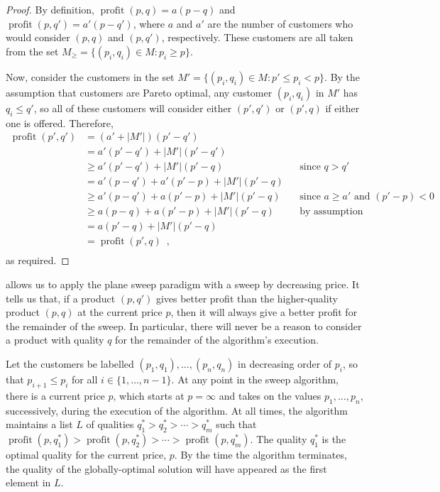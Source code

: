 \documentclass[lotsofwhite]{patmorin}
\newcommand{\val}{\operatorname{profit}}
\begin{document}
\begin{proof}
  By definition, $\val(p,q) = a(p-q)$ and $\val(p,q') = a'(p-q')$, where
  $a$ and $a'$ are the number of customers who would consider $(p,q)$
  and $(p,q')$, respectively.  These customers are all taken from the
  set $M_\ge =\{(p_i,q_i)\in M: p_i \ge p\}$.

  Now, consider the customers in the set $M'=\{(p_i,q_i)\in M: p' \le
  p_i < p\}$.  By the assumption that customers are Pareto optimal,
  any customer $(p_i,q_i)$ in $M'$ has $q_i \le q'$, so all of these
  customers will consider either $(p',q')$ or $(p',q)$ if either one
  is offered.  Therefore,
  \[
    \begin{aligned}
      \val(p',q')
        &  =   (a'+|M'|)(p'-q') \\
        &  =   a'(p'-q') + |M'|(p'-q') \\
        & \ge  a'(p'-q') + |M'|(p'-q) 
               && \mbox{since $q > q'$} \\
        &  =   a'(p-q') + a'(p'-p) + |M'|(p'-q) \\
        & \ge  a'(p-q') + a(p'-p) + |M'|(p'-q) 
               && \mbox{since $a \ge a'$ and $(p'-p) < 0$} \\
        & \ge  a(p-q) + a(p'-p) + |M'|(p'-q) 
               && \mbox{by assumption} \\
        &  =  a(p'-q) + |M'|(p'-q) \\
        &  =  \val(p',q) \enspace , \\
    \end{aligned}
  \]
  as required.
\end{proof}

 allows us to apply the plane sweep paradigm with a sweep
by decreasing price.  It tells us that, if a product $(p,q')$ gives better
profit than the higher-quality product $(p,q)$ at the current price $p$,
then it will always give a better profit for the remainder of the sweep.
In particular, there will never be a reason to consider a product with
quality $q$ for the remainder of the algorithm's execution.

Let the customers be labelled $(p_1,q_1),\ldots,(p_n,q_n)$ in decreasing
order of $p_i$, so that $p_{i+1} \le p_i$ for all $i\in\{1,\ldots,n-1\}$.
At any point in the sweep algorithm, there is a current price $p$, which
starts at $p=\infty$ and takes on the values $p_1,\ldots,p_n$,
successively, during the execution of the algorithm.  At all times, the
algorithm maintains a list $L$ of qualities $q_1^* > q_2^* > \cdots >
q_m^*$ such that $\val(p,q_1^*) > \val(p,q_2^*) >\cdots>\val(p,q_m^*)$.
The quality $q_1^*$ is the optimal quality for the current price, $p$.  By
the time the algorithm terminates, the quality of the globally-optimal
solution will have appeared as the first element in $L$.
\end{document}

